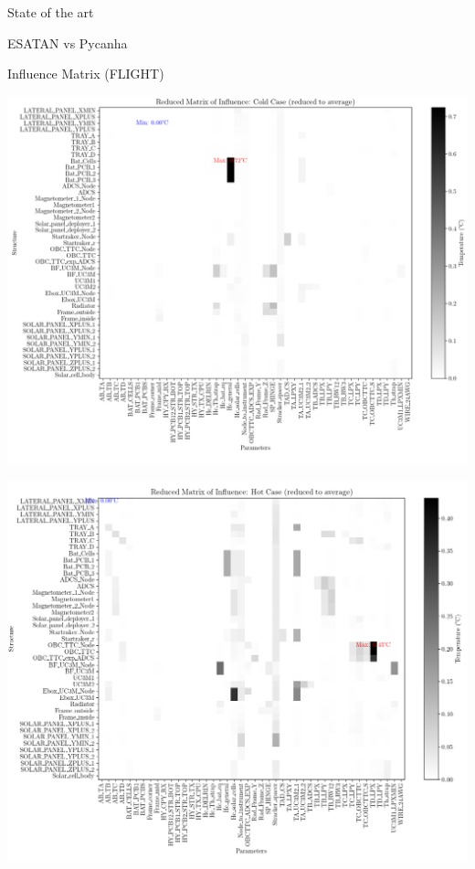 \documentclass{cubeamer}
\begin{document}
\begin{frame}{State of the art}
\begin{minipage}{0.65\textwidth}
\begin{frame}{ESATAN vs Pycanha}
\begin{frame}{Influence Matrix (FLIGHT)}
\begin{center}
    \begin{minipage}{0.475\textwidth}
    \includegraphics[width=1\linewidth]{Figures/Flight/infmatCC-F.png}
\end{minipage}
\begin{minipage}{0.475\textwidth}
    \includegraphics[width=1\linewidth]{Figures/Flight/infmatHC-F.png}
\end{minipage}
\end{center}


\end{frame}
\end{frame}
\end{minipage}
\end{frame}
\end{document}
